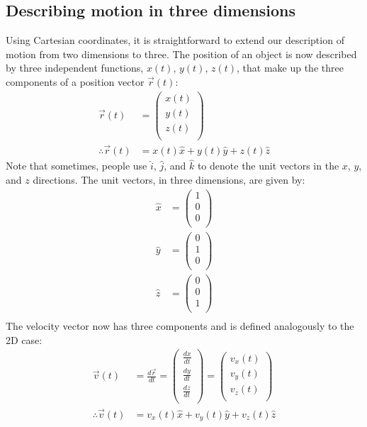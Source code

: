 \subsection{Describing motion in three dimensions}
Using Cartesian coordinates, it is straightforward to extend our description of motion from two dimensions to three.  The position of an object is now described by three independent functions, $x(t)$, $y(t)$, $z(t)$, that make up the three components of a position vector $\vec r(t)$:
\begin{align*}
\vec r(t) &= \begin{pmatrix}
           x(t) \\
           y(t) \\
           z(t)  \\
         \end{pmatrix}\\
\therefore \vec r(t)  &= x(t) \hat x + y(t) \hat y + z(t) \hat z
\end{align*}
Note that sometimes, people use $\hat i$, $\hat j$, and $\hat k$ to denote the unit vectors in the $x$, $y$, and $z$ directions. The unit vectors, in three dimensions, are given by:
\begin{align*}
\hat x &= \begin{pmatrix}
           1\\
           0 \\
           0\\
         \end{pmatrix}\\
\hat y &= \begin{pmatrix}
           0\\
           1 \\
           0\\
         \end{pmatrix}\\ 
\hat z &= \begin{pmatrix}
           0\\
           0 \\
           1\\
         \end{pmatrix}\\ 
\end{align*}
The velocity vector now has three components and is defined analogously to the 2D case:
\begin{align*}
\vec v(t) &=\frac{d\vec r}{dt}
 =\begin{pmatrix}
           \frac{dx}{dt}  \\
          \frac{dy}{dt}  \\
          \frac{dz}{dt}  \\
         \end{pmatrix}
 =\begin{pmatrix}
           v_x(t) \\
           v_y(t) \\
           v_z(t) \\
         \end{pmatrix}\\   
\therefore \vec v(t) &= v_x(t)\hat x+v_y(t)\hat y+v_z(t)\hat z  \nonumber 
\end{align*}
